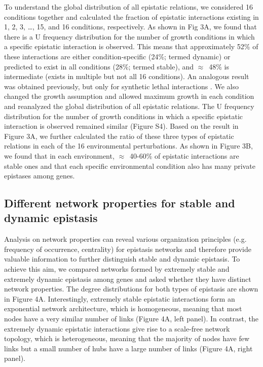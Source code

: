 To understand the global distribution of all epistatic relations, we
considered 16 conditions together and calculated the fraction of
epistatic interactions existing in 1, 2, 3, \ldots, 15, and 16
conditions, respectively. As shown in Fig 3A, we found that there is a
U frequency distribution for the number of growth conditions in which
a specific epistatic interaction is observed. This means that
approximately 52\% of these interactions are either condition-specific
(24\%; termed dynamic) or predicted to exist in all conditions (28\%;
termed stable), and $\approx$~48\% is intermediate (exists in multiple but not
all 16 conditions). An analogous result was obtained previously, but
only for synthetic lethal interactions \citep{Harrison2007}. We also changed the
growth assumption and allowed maximum growth in each condition and
reanalyzed the global distribution of all epistatic relations. The U
frequency distribution for the number of growth conditions in which a
specific epistatic interaction is observed remained similar (Figure
S4). Based on the result in Figure 3A, we further calculated the ratio
of these three types of epistatic relations in each of the 16
environmental perturbations. As shown in Figure 3B, we found that in
each environment, $\approx$~40-60\% of epistatic interactions are stable ones
and that each specific environmental condition also has many private
epistases among genes.

\subsection{Different network properties for stable and dynamic epistasis}

Analysis on network properties can reveal various organization
principles (e.g. frequency of occurrence, centrality) for epistasis
networks \citep{Tong2004, Costanzo2010} and therefore provide valuable
information to further
distinguish stable and dynamic epistasis. To achieve this aim, we
compared networks formed by extremely stable and extremely dynamic
epistasis among genes and asked whether they have distinct network
properties. The degree distributions for both types of epistasis are
shown in Figure 4A. Interestingly, extremely stable epistatic
interactions form an exponential network architecture, which is
homogeneous, meaning that most nodes have a very similar number of
links (Figure 4A, left panel). In contrast, the extremely dynamic
epistatic interactions give rise to a scale-free network topology,
which is heterogeneous, meaning that the majority of nodes have few
links but a small number of hubs have a large number of links (Figure
4A, right panel).

